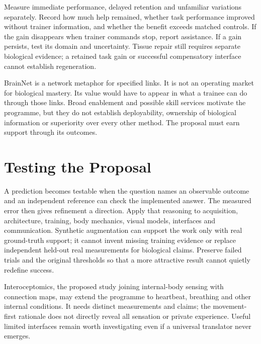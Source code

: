 Measure immediate performance, delayed retention and unfamiliar variations separately. Record how much help remained, whether task performance improved without trainer information, and whether the benefit exceeds matched controls. If the gain disappears when trainer commands stop, report assistance. If a gain persists, test its domain and uncertainty. Tissue repair still requires separate biological evidence; a retained task gain or successful compensatory interface cannot establish regeneration.\par

BrainNet is a network metaphor for specified links. It is not an operating market for biological mastery. Its value would have to appear in what a trainee can do through those links. Broad enablement and possible skill services motivate the programme, but they do not establish deployability, ownership of biological information or superiority over every other method. The proposal must earn support through its outcomes.\par






\section{Testing the Proposal}

A prediction becomes testable when the question names an observable outcome and an independent reference can check the implemented answer. The measured error then gives refinement a direction. Apply that reasoning to acquisition, architecture, training, body mechanics, visual models, interfaces and communication. Synthetic augmentation can support the work only with real ground-truth support; it cannot invent missing training evidence or replace independent held-out real measurements for biological claims. Preserve failed trials and the original thresholds so that a more attractive result cannot quietly redefine success.\par

Interoceptomics, the proposed study joining internal-body sensing with connection maps, may extend the programme to heartbeat, breathing and other internal conditions. It needs distinct measurements and claims; the movement-first rationale does not directly reveal all sensation or private experience. Useful limited interfaces remain worth investigating even if a universal translator never emerges.\par

